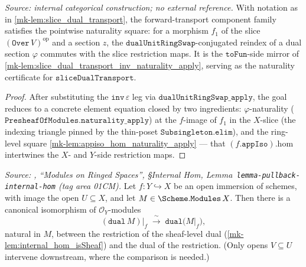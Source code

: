 \begin{lemma}\label{mk-lem:slice_dual_transport_naturality_apply}
  \leanok

  \textit{Source: internal categorical construction; no external reference.}
  With notation as in \ref{mk-lem:slice_dual_transport}, the forward-transport component family
  satisfies the pointwise naturality square: for a morphism \(f_1\) of the slice
  \((\mathtt{Over}\,V)^{\mathrm{op}}\) and a section \(z\), the \(\mathtt{dualUnitRingSwap}\)-conjugated
  reindex of a dual section \(\varphi\) commutes with the slice restriction maps. It is
  the \(\mathtt{toFun}\)-side mirror of \ref{mk-lem:slice_dual_transport_inv_naturality_apply},
  serving as the naturality certificate for \(\mathtt{sliceDualTransport}\).
\end{lemma}
\begin{proof}
  \leanok
  After substituting the \(\mathtt{inv}\,\varepsilon\) leg via
  \(\mathtt{dualUnitRingSwap\_apply}\), the goal reduces to a concrete element equation closed by two
  ingredients: \(\varphi\)-naturality (\(\mathtt{PresheafOfModules.naturality\_apply}\)) at the
  \(f\)-image of \(f_1\) in the \(X\)-slice (the indexing triangle pinned by the thin-poset
  \(\mathtt{Subsingleton.elim}\)), and the ring-level square \ref{mk-lem:appiso_hom_naturality_apply}
  --- that \((f.\mathtt{appIso}).\mathrm{hom}\) intertwines the \(X\)- and \(Y\)-side
  restriction maps.
\end{proof}

\begin{lemma}\label{mk-lem:dual_restrict_iso}
  \leanok

  \textit{Source: \cite{stacks-project}, ``Modules on Ringed Spaces'', \S Internal Hom,
  Lemma~\texttt{lemma-pullback-internal-hom} (tag area 01CM).}
  Let \(f : Y \hookrightarrow X\) be an open immersion of schemes, with image the open
  \(U \subseteq X\), and let \(M \in \Scheme.\mathtt{Modules}\,X\). Then there is a
  canonical isomorphism of \(\mathcal{O}_Y\)-modules
  \[
    (\mathtt{dual}\,M)\big|_f \;\xrightarrow{\ \sim\ }\; \mathtt{dual}\bigl(M|_f\bigr),
  \]
  natural in \(M\), between the restriction of the sheaf-level dual
  (\ref{mk-lem:internal_hom_isSheaf}) and the dual of the restriction. (Only opens
  \(V \subseteq U\) intervene downstream, where the comparison is needed.)
\end{lemma}

